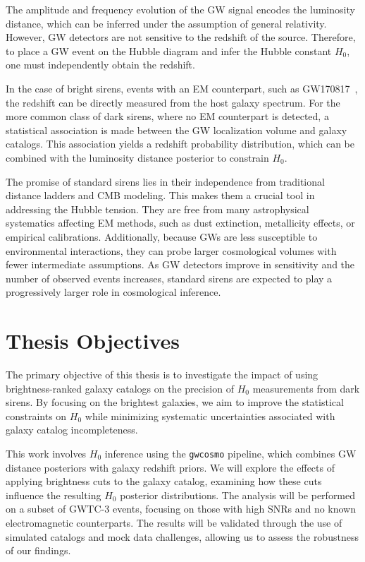 The amplitude and frequency evolution of the \ac{GW} signal encodes the luminosity distance, which can be inferred under the assumption of general relativity. However, \ac{GW} detectors are not sensitive to the redshift of the source. Therefore, to place a \ac{GW} event on the Hubble diagram and infer the Hubble constant $H_0$, one must independently obtain the redshift.

In the case of bright sirens, events with an \ac{EM} counterpart, such as GW170817~\citep{LIGOScientific:2017adf}, the redshift can be directly measured from the host galaxy spectrum. For the more common class of dark sirens, where no \ac{EM} counterpart is detected, a statistical association is made between the \ac{GW} localization volume and galaxy catalogs. This association yields a redshift probability distribution, which can be combined with the luminosity distance posterior to constrain $H_0$.

The promise of standard sirens lies in their independence from traditional distance ladders and \ac{CMB} modeling. This makes them a crucial tool in addressing the Hubble tension. They are free from many astrophysical systematics affecting \ac{EM} methods, such as dust extinction, metallicity effects, or empirical calibrations. Additionally, because \acp{GW} are less susceptible to environmental interactions, they can probe larger cosmological volumes with fewer intermediate assumptions. As \ac{GW} detectors improve in sensitivity and the number of observed events increases, standard sirens are expected to play a progressively larger role in cosmological inference.

\section{Thesis Objectives}
The primary objective of this thesis is to investigate the impact of using brightness-ranked galaxy catalogs on the precision of $H_0$ measurements from dark sirens. By focusing on the brightest galaxies, we aim to improve the statistical constraints on $H_0$ while minimizing systematic uncertainties associated with galaxy catalog incompleteness.

This work involves $H_0$ inference using the \texttt{gwcosmo} pipeline, which combines \ac{GW} distance posteriors with galaxy redshift priors. We will explore the effects of applying brightness cuts to the galaxy catalog, examining how these cuts influence the resulting $H_0$ posterior distributions. The analysis will be performed on a subset of \ac{GWTC}-3 events, focusing on those with high \acp{SNR} and no known electromagnetic counterparts. The results will be validated through the use of simulated catalogs and mock data challenges, allowing us to assess the robustness of our findings.

